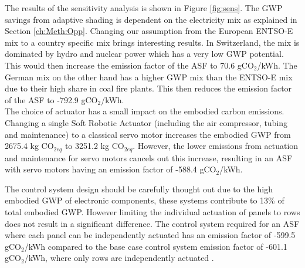 The results of the sensitivity analysis is shown in Figure \ref{fig:sens}. The GWP savings from adaptive shading is dependent on the electricity mix as explained in Section \ref{ch:Meth:Opp}. Changing our assumption from the European ENTSO-E mix to a country specific mix brings interesting results. In Switzerland, the mix is dominated by hydro and nuclear power which has a very low GWP potential\cite{itten2012life}. This would then increase the emission factor of the ASF to 70.6 gCO${_2}$/kWh.
The German mix on the other hand has a higher GWP mix than the ENTSO-E mix due to their high share in coal fire plants. This then reduces the emission factor of the ASF to -792.9 gCO${_2}$/kWh.\\

The choice of actuator has a small impact on the embodied carbon emissions. Changing a single Soft Robotic Actuator (including the air compressor, tubing and maintenance) to a classical servo motor increases the embodied GWP from 2675.4 kg CO$_{2eq}$ to 3251.2 kg CO$_{2eq}$. However, the lower emissions from actuation and maintenance for servo motors cancels out this increase, resulting in an ASF with servo motors having an emission factor of -588.4 gCO${_2}$/kWh.

The control system design should be carefully thought out due to the high embodied GWP of electronic components, these systems contribute to 13\% of total embodied GWP. However limiting the individual actuation of panels to rows does not result in a significant difference. The control system required for an ASF where each panel can be independently actuated has an emission factor of -599.5 gCO${_2}$/kWh compared to the base case control system emission factor of -601.1 gCO${_2}$/kWh, where only rows are independently actuated .\\



